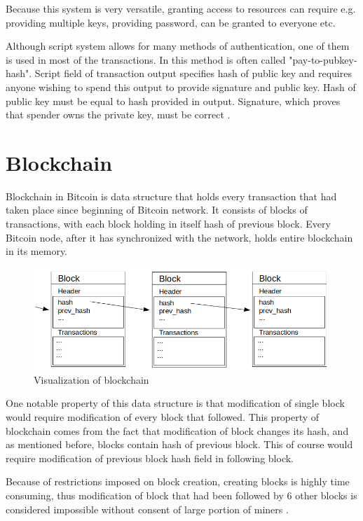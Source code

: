 \documentclass[12pt, en, eng, oneside, final]{mgr}
\begin{document}
Because this system is very versatile, granting access to resources can require e.g. providing multiple keys, providing password, can be granted to everyone etc. 

Although script system allows for many methods of authentication, one of them is used in most of the transactions. In this method is often called "pay-to-pubkey-hash". Script field of transaction output specifies hash of public key and requires anyone wishing to spend this output to provide signature and public key. Hash of public key must be equal to hash provided in output. Signature, which proves that spender owns the private key, must be correct \cite{bitcoin-script}.


\section{Blockchain}
Blockchain in Bitcoin is data structure that holds every transaction that had taken place since beginning of Bitcoin network. It consists of blocks of transactions, with each block holding in itself hash of previous block. Every Bitcoin node, after it has synchronized with the network, holds entire blockchain in its memory.

\begin{figure}[H]
  \includegraphics[width=0.8\linewidth]{blockchain.png}
  \caption{Visualization of blockchain}
  \label{fig:visualization-of-blockchain}
\end{figure}

One notable property of this data structure is that modification of single block would require modification of every block that followed. This property of blockchain comes from the fact that modification of block changes its hash, and as mentioned before, blocks contain hash of previous block. This of course would require modification of previous block hash field in following block. 

Because of restrictions imposed on block creation, creating blocks is highly time consuming, thus modification of block that had been followed by 6 other blocks is considered impossible without consent of large portion of miners \cite{confirmation}.
\end{document}
